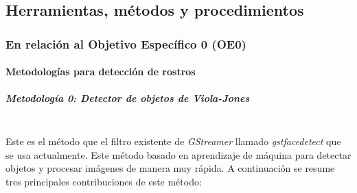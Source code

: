 \documentclass[a4paper,openright,12pt]{report}
\begin{document}
\subsection{Herramientas, métodos y procedimientos}

\subsubsection{En relación al Objetivo Específico 0 (OE0)}

\paragraph{Metodologías para detección de rostros}
\subparagraph{Metodología 0: Detector de objetos de Viola-Jones}\mbox{} \\
Este es el método que el filtro existente de \textit{GStreamer} llamado
\textit{gstfacedetect} que se usa actualmente. Este método basado en aprendizaje
de máquina para detectar objetos y procesar imágenes de manera muy rápida. A
continuación se resume tres principales contribuciones de este método:
\end{document}

